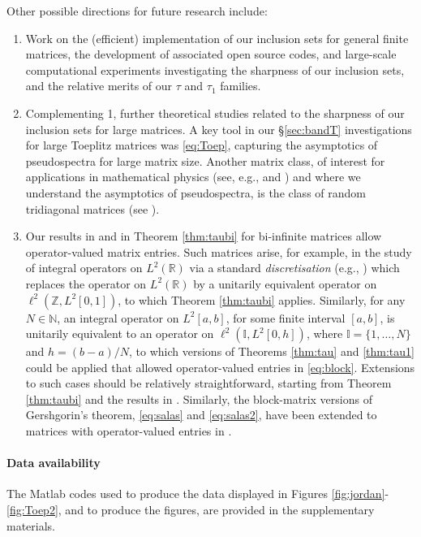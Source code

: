 \documentclass[preprint,1p,11pt]{elsarticle}
\newcommand\N{{\mathbb N}}
\newcommand\I{{\mathbb I}}
\newcommand\R{{\mathbb R}}
\newcommand\Z{{\mathbb Z}}
\numberwithin{equation}{section}   %
\numberwithin{figure}{section}  %
\begin{document}
Other possible directions for future research include:
\begin{enumerate}
\item Work on the (efficient) implementation of our inclusion sets for general finite matrices, the development of associated open source codes, and large-scale computational experiments investigating the sharpness of our inclusion sets, and the relative merits of our $\tau$ and $\tau_1$ families.
\item Complementing 1, further theoretical studies related to the sharpness of our inclusion sets for large matrices. A key tool in our \S\ref{sec:bandT}  investigations for large Toeplitz matrices was \eqref{eq:Toep}, capturing the asymptotics of pseudospectra for large matrix size. Another matrix class, of interest for applications in mathematical physics (see, e.g., \cite[\S VIII]{TrefEmbBook} and \cite[\S8.4]{CW.Heng.ML:SpecIncl1}) and where we understand the asymptotics of pseudospectra, is the class of random tridiagonal matrices (see \cite[Remark 4.17]{CWLi2016:Coburn}). %
\item Our results in \cite{CW.Heng.ML:SpecIncl1} and in Theorem \ref{thm:taubi} for bi-infinite matrices allow operator-valued matrix entries. Such matrices arise, for example,  in the study of integral operators on $L^2(\R)$ via a standard {\em discretisation} (e.g., \cite[{\S}1.2.3]{LiBook}) which replaces the operator on $L^2(\R)$ by a unitarily equivalent operator on $\ell^2(\Z,L^2[0,1])$, to which Theorem \ref{thm:taubi} applies.  Similarly, for any $N\in \N$, an integral operator on $L^2[a,b]$, for some finite interval $[a,b]$, is unitarily equivalent to an operator on $\ell^2(\I,L^2[0,h])$, where $\I=\{1,\ldots,N\}$ and $h=(b-a)/N$, to which versions of Theorems \ref{thm:tau} and \ref{thm:tau1} could be applied that allowed operator-valued  entries in \eqref{eq:block}. Extensions to such cases  should be relatively straightforward, starting from Theorem \ref{thm:taubi} and the results in \cite{CW.Heng.ML:SpecIncl1}. Similarly, the block-matrix versions of Gershgorin's theorem, \eqref{eq:salas} and \eqref{eq:salas2}, have been extended to matrices with operator-valued entries in \cite{Salas}.
\end{enumerate}

\paragraph{Data availability} The Matlab codes used to produce the data displayed in Figures \ref{fig:jordan}-\ref{fig:Toep2}, and to produce the figures, are provided in the supplementary materials.
\end{document}
